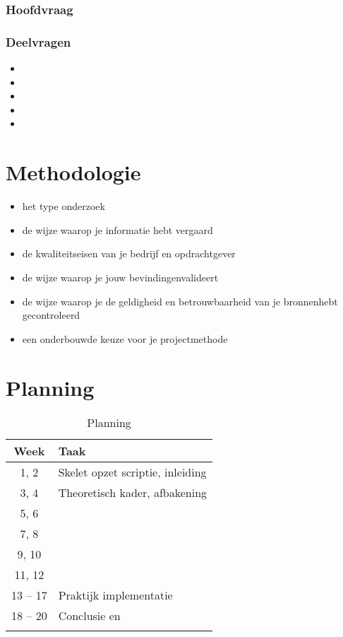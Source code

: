 \subsubsection{Hoofdvraag}
\hoofdvraagname

\subsubsection{Deelvragen}
\begin{itemize}
	\item \deelhuidig
	\item \deeltechnieken
	\item \deelverbetering
	\item \deelimplementatie
	\item \deelrequirements
\end{itemize}

\section{Methodologie}
\begin{itemize}
	\item het type onderzoek
	\item de wijze waarop je informatie hebt vergaard
	\item de kwaliteitseisen van je bedrijf en opdrachtgever
	\item de wijze waarop je jouw bevindingenvalideert 
	\item de wijze waarop je de geldigheid en betrouwbaarheid van je bronnenhebt gecontroleerd
	\item een onderbouwde keuze voor je projectmethode
\end{itemize}

\section{Planning}
\begin{table}[h]
	\caption{Planning}
	\label{tab:planning}
	\centering
	\begin{tabular}{c p{12cm}}
		\toprule
		\textbf{Week} & \textbf{Taak}\\
		\midrule
			1, 2 & Skelet opzet scriptie, inleiding \\
			3, 4 & Theoretisch kader, afbakening \\
			5, 6 & \deelhuidig \\
			7, 8 & \deeltechnieken \\
			9, 10 & \deelverbetering \\
			11, 12 & \deelimplementatie \\
			13 -- 17 & Praktijk implementatie \\
			18 -- 20 & Conclusie en \deelrequirements \\
		\bottomrule\\
	\end{tabular}
\end{table}
